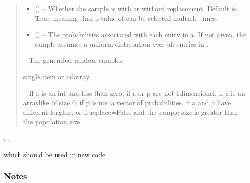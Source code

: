 \documentclass[letterpaper,10pt,english]{sphinxmanual}
\begin{document}
\begin{fulllineitems}
\begin{quote}
\begin{description}
\begin{itemize}
\item {} 
\sphinxAtStartPar
{} (\sphinxstyleliteralemphasis{\sphinxupquote{, }}) – Whether the sample is with or without replacement. Default is True,
meaning that a value of  can be selected multiple times.

\item {} 
\sphinxAtStartPar
{} (\sphinxstyleliteralemphasis{\sphinxupquote{, }}) – The probabilities associated with each entry in a.
If not given, the sample assumes a uniform distribution over all
entries in .

\end{itemize}

\sphinxAtStartPar
{} – The generated random samples

\sphinxAtStartPar
single item or ndarray

\sphinxAtStartPar
{} – If a is an int and less than zero, if a or p are not 1\sphinxhyphen{}dimensional,
    if a is an array\sphinxhyphen{}like of size 0, if p is not a vector of
    probabilities, if a and p have different lengths, or if
    replace=False and the sample size is greater than the population
    size

\end{description}\end{quote}


\nopagebreak


\sphinxAtStartPar
{}, , 
\begin{description}
\sphinxAtStartPar
which should be used in new code

\end{description}


\subsubsection*{Notes}


\end{fulllineitems}
\end{document}
